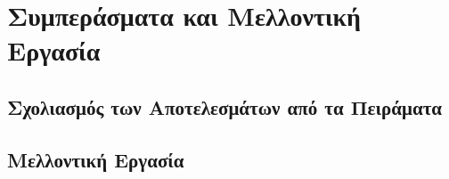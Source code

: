 \chapter{Συμπεράσματα και Μελλοντική Εργασία}
\section{Σχολιασμός των Αποτελεσμάτων από τα Πειράματα}

\section{Μελλοντική Εργασία}